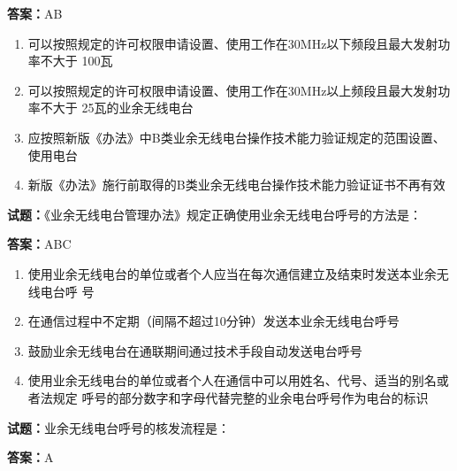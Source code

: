 \documentclass{ctexbook}
\begin{document}
\textbf{答案：}AB 

\begin{enumerate}[leftmargin=3em]
  \item 可以按照规定的许可权限申请设置、使用工作在30MHz以下频段且最大发射功率不大于
100瓦 

  \item 可以按照规定的许可权限申请设置、使用工作在30MHz以上频段且最大发射功率不大于
25瓦的业余无线电台 

  \item 应按照新版《办法》中B类业余无线电台操作技术能力验证规定的范围设置、使用电台 

  \item 新版《办法》施行前取得的B类业余无线电台操作技术能力验证证书不再有效 

\end{enumerate}





\vspace{1em}

\textbf{试题：}《业余无线电台管理办法》规定正确使用业余无线电台呼号的方法是： 

\textbf{答案：}ABC 

\begin{enumerate}[leftmargin=3em]
  \item 使用业余无线电台的单位或者个人应当在每次通信建立及结束时发送本业余无线电台呼
号 

  \item 在通信过程中不定期（间隔不超过10分钟）发送本业余无线电台呼号 

  \item 鼓励业余无线电台在通联期间通过技术手段自动发送电台呼号 

  \item 使用业余无线电台的单位或者个人在通信中可以用姓名、代号、适当的别名或者法规定
呼号的部分数字和字母代替完整的业余电台呼号作为电台的标识 

\end{enumerate}





\vspace{1em}

\textbf{试题：}业余无线电台呼号的核发流程是： 

\textbf{答案：}A 
\end{document}
